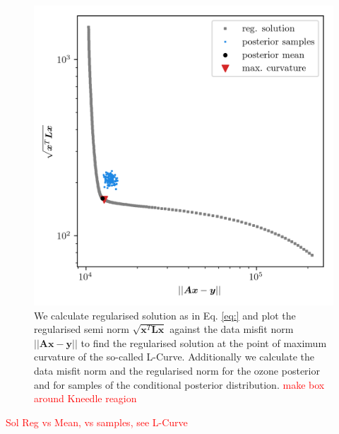 \begin{figure}[ht!]
	\centering
	\includegraphics{LCurvePhD.png}
	\caption[Plot of the L-curve to find the regularised solution.]{We calculate regularised solution as in Eq. \ref{eq:} and plot the regularised semi norm $\sqrt{\bm{x}^T\bm{Lx}}$ against the data misfit norm $||\bm{Ax} -\bm{y} ||$ to find the regularised solution at the point of maximum curvature of the so-called L-Curve. Additionally we calculate the data misfit norm and the regularised norm for the ozone posterior and for samples of the conditional posterior distribution. \textcolor{red}{make box around Kneedle reagion}}
	\label{fig:LCurve}
\end{figure}

\textcolor{red}{Sol Reg vs Mean, vs samples, see L-Curve}






